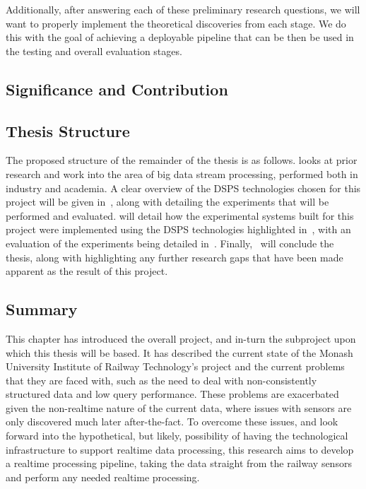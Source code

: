Additionally, after answering each of these preliminary research questions, we will want to properly implement the
theoretical discoveries from each stage. We do this with the goal of achieving a deployable pipeline that can be then
be used in the testing and overall evaluation stages.




\subsection{Significance and Contribution} %
\label{sub:significance_and_contribution}



\subsection{Thesis Structure} %
\label{sub:proposed_thesis_chapter_headings}

The proposed structure of the remainder of the thesis is as follows.  looks at prior
research and work into the area of big data stream processing, performed both in industry and academia.
A clear overview of the DSPS technologies chosen for this project will be given in~,
along with detailing the experiments that will be performed and evaluated. 
will detail how the experimental systems built
for this project were implemented using the DSPS technologies highlighted in~,
with an evaluation of the experiments being detailed in~.
Finally,~ will conclude the thesis, along with highlighting any further research
gaps that have been made apparent as the result of this project.



\subsection{Summary} %
\label{sec:summary}

This chapter has introduced the overall project, and in-turn the subproject upon which this thesis will be based. It
has described the current state of the Monash University Institute of Railway Technology's project and the current
problems that they are faced with, such as the need to deal with non-consistently structured data and low query
performance. These problems are exacerbated given the non-realtime nature of the current data, where issues with sensors
are only discovered much later after-the-fact. To overcome these issues, and look forward into the hypothetical,
but likely, possibility of having the technological infrastructure to support realtime data processing, this research
aims to develop a realtime processing pipeline, taking the data straight from the railway sensors and perform any
needed realtime processing.

